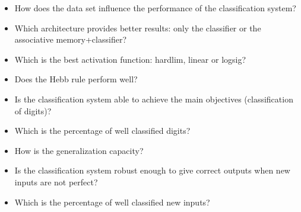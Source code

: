 \documentclass{article}
\begin{document}
\begin{itemize}
\item How does the data set influence the performance of the classification system?

\item Which architecture provides better results: only the classifier or the associative memory+classifier?

\item Which is the best activation function: hardlim, linear or logsig?

\item Does the Hebb rule perform well?

\item Is the classification system able to achieve the main objectives (classification of digits)?

\item Which is the percentage of well classified digits?

\item How is the generalization capacity?

\item Is the classification system robust enough to give correct outputs when new inputs are not perfect?

\item Which is the percentage of well classified new inputs?
\end{itemize}

\pagebreak
\end{document}
